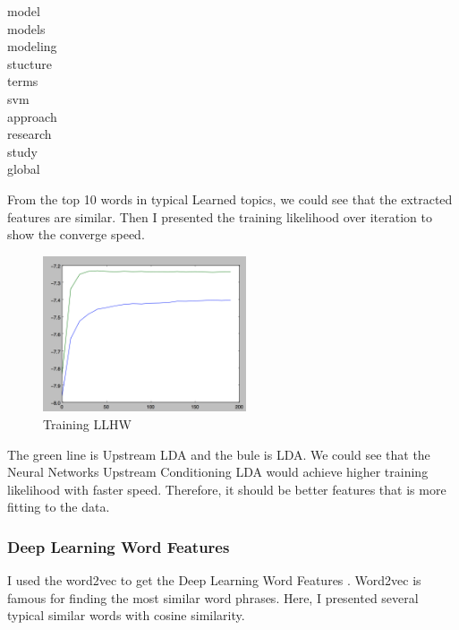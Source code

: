 \begin{minipage}{.196\textwidth}
\centering
model \\
models \\
modeling \\
stucture \\
terms \\
svm \\
approach \\
research \\
study \\
global
\end{minipage}

From the top 10 words in typical Learned topics, we could see that the extracted
features are similar. Then I presented the training likelihood over iteration to
show the converge speed.

\begin{figure}[!htbp]
    \centering
    \includegraphics[width=6cm]{./pic/LLHW.png}
    \caption{Training LLHW}
\end{figure}

The green line is Upstream LDA and the bule is LDA.
We could see that the Neural Networks Upstream Conditioning LDA would achieve
higher training likelihood with faster speed. Therefore, it should be better
features that is more fitting to the data.

\subsubsection{Deep Learning Word Features}
I used the word2vec to get the Deep Learning Word Features
\cite{mikolov2013distributed}. Word2vec is famous for finding the most similar
word phrases. Here, I presented several typical similar words with cosine
similarity.


